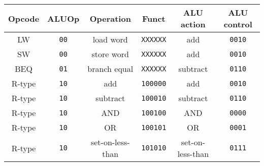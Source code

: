 \begin{tabular}[t]{cccccc}
    \toprule
    Opcode & ALUOp       & Operation        & Funct           & ALU action       & ALU control   \\
    \midrule
    LW     & \texttt{00} & load word        & \texttt{XXXXXX} & add              & \texttt{0010} \\
    SW     & \texttt{00} & store word       & \texttt{XXXXXX} & add              & \texttt{0010} \\
    BEQ    & \texttt{01} & branch equal     & \texttt{XXXXXX} & subtract         & \texttt{0110} \\
    R-type & \texttt{10} & add              & \texttt{100000} & add              & \texttt{0010} \\
    R-type & \texttt{10} & subtract         & \texttt{100010} & subtract         & \texttt{0110} \\
    R-type & \texttt{10} & AND              & \texttt{100100} & AND              & \texttt{0000} \\
    R-type & \texttt{10} & OR               & \texttt{100101} & OR               & \texttt{0001} \\
    R-type & \texttt{10} & set-on-less-than & \texttt{101010} & set-on-less-than & \texttt{0111} \\
    \bottomrule
\end{tabular}
